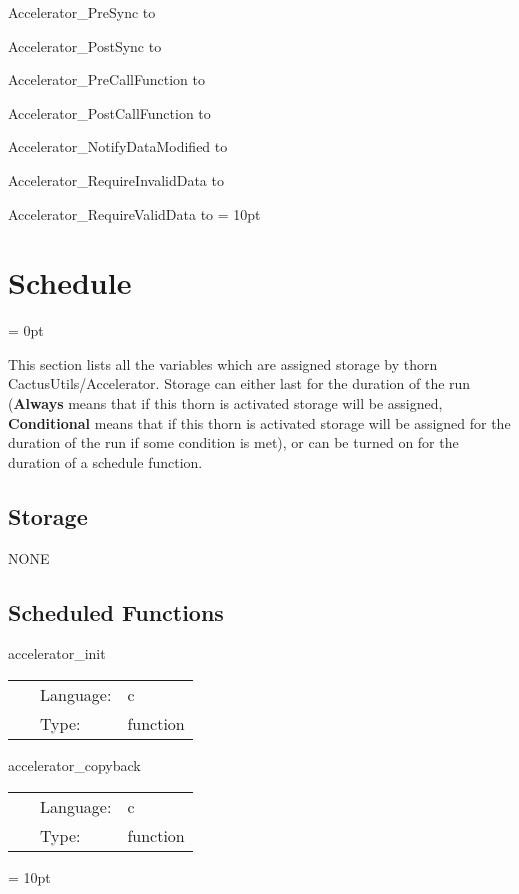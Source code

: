 Accelerator\_PreSync to 

Accelerator\_PostSync to 

Accelerator\_PreCallFunction to 

Accelerator\_PostCallFunction to 

Accelerator\_NotifyDataModified to 

Accelerator\_RequireInvalidData to 

Accelerator\_RequireValidData to 
\vspace{2mm}\parskip = 10pt 

\section{Schedule} 


\parskip = 0pt


\noindent This section lists all the variables which are assigned storage by thorn CactusUtils/Accelerator.  Storage can either last for the duration of the run ({\bf Always} means that if this thorn is activated storage will be assigned, {\bf Conditional} means that if this thorn is activated storage will be assigned for the duration of the run if some condition is met), or can be turned on for the duration of a schedule function.


\subsection*{Storage}NONE
\subsection*{Scheduled Functions}
\vspace{5mm}


\hspace{5mm} accelerator\_init 

\hspace{5mm}{\it initialise accelerator thorn } 


\hspace{5mm}

 \begin{tabular*}{160mm}{cll} 
~ & Language:  & c \\ 
~ & Type:  & function \\ 
\end{tabular*} 


\vspace{5mm}


\hspace{5mm} accelerator\_copyback 

\hspace{5mm}{\it copy memory buffers back to host memory } 


\hspace{5mm}

 \begin{tabular*}{160mm}{cll} 
~ & Language:  & c \\ 
~ & Type:  & function \\ 
\end{tabular*} 



\vspace{5mm}\parskip = 10pt 

